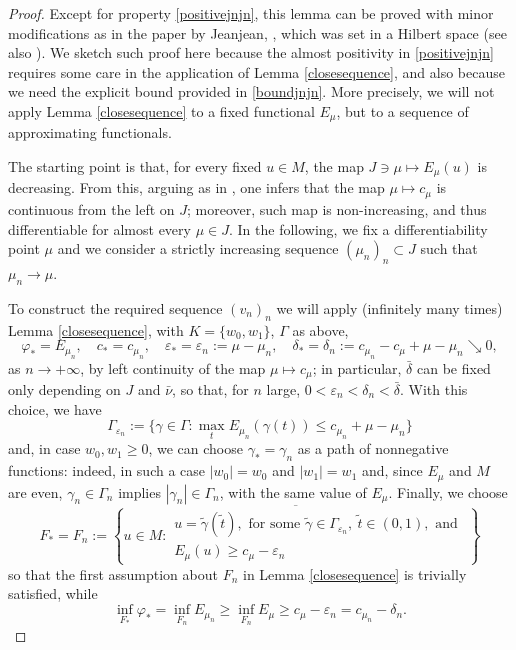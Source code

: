\documentclass[10pt]{article}
\newcommand{\eps}{\varepsilon}
\theoremstyle{definition}
\numberwithin{equation}{section}
\begin{document}
\begin{proof}
Except for property \ref{positivejnjn}, this lemma can be proved with minor modifications as in the 
paper by Jeanjean, \cite[Prop. 2.1, Lemma 2.3]{JJ_BPS}, which was set in a Hilbert space (see also 
\cite{JJS_absrtact}). We sketch such proof here because the almost positivity in \ref{positivejnjn} 
requires some care in the application of Lemma \ref{closesequence}, and also because 
we need the explicit bound provided in \ref{boundjnjn}. More precisely, we will not apply Lemma 
\ref{closesequence} to a fixed functional $E_\mu$, but to a sequence of approximating functionals.

The starting point is that, for every fixed $u\in M$, the map $J\ni\mu\mapsto E_\mu(u)$ is decreasing. 
From this, arguing as in \cite[Lemma 2.3]{JJ_BPS}, one infers that the map $\mu\mapsto c_\mu$ is  
continuous from the left on $J$; moreover, such map is non-increasing, and thus differentiable for 
almost every $\mu\in J$. In the following, we fix a differentiability point $\mu$ and we 
consider a strictly increasing sequence $(\mu_{n})_{n}\subset J$ such that $\mu_{n}\rightarrow \mu$. 

To construct the required sequence $(v_n)_n$ we will apply (infinitely many times) Lemma \ref{closesequence}, with $K=\{w_0,w_1\}$, $\Gamma$ as above, 
\[
\varphi_*=E_{\mu_n},\quad c_*=c_{\mu_n},\quad \eps_*=\eps_n := \mu - \mu_n,\quad \delta_*=\delta_n := c_{\mu_n} - c_\mu + \mu - \mu_n\searrow 0,
\]
as $n\to+\infty$, by left continuity of the map $\mu\mapsto c_\mu$; in particular,  
$\bar\delta$ can be fixed only depending on $J$ and $\bar\nu$, so that, for $n$ large, $0<\eps_n<\delta_n<\bar\delta$. With this choice, we have
\begin{equation*}%
\Gamma_{\eps_n} := \{\gamma \in\Gamma : \max_{t}E_{\mu_n}(\gamma(t)) \le c_{\mu_n}+\mu - \mu_n \}\end{equation*}
%
and, in case $w_{0},w_{1}\geq0$, we can choose $\gamma_*=\gamma_n$ as a path of nonnegative 
functions: indeed, in such a case $|w_{0}|=w_{0}$ and $|w_{1}|=w_{1}$ and, since $E_{\mu}$ and $M$ are 
even, $\gamma_{n}\in\Gamma_n$ implies $|\gamma_{n}|\in\Gamma_n$, with the same value of $E_\mu$. 
Finally, we choose
\[
F_*=F_n:=\overline{\left\{u \in M : 
\begin{array}{c}
u = \tilde\gamma(\tilde t),\text{ for some }\tilde\gamma\in\Gamma_{\eps_n},\ \tilde t\in(0,1), \text{ and }\\
 E_{\mu}(u) \ge c_\mu-\eps_n 
\end{array}
\right\}}
\]
so that the first assumption about $F_n$ in Lemma \ref{closesequence} is trivially satisfied, while
\[
\inf_{F_*}\varphi_*=\inf_{F_n}E_{\mu_n} \ge \inf_{F_n}E_{\mu} \ge  c_\mu-\eps_n = c_{\mu_n} - \delta_n.
\]


\end{proof}
\end{document}
